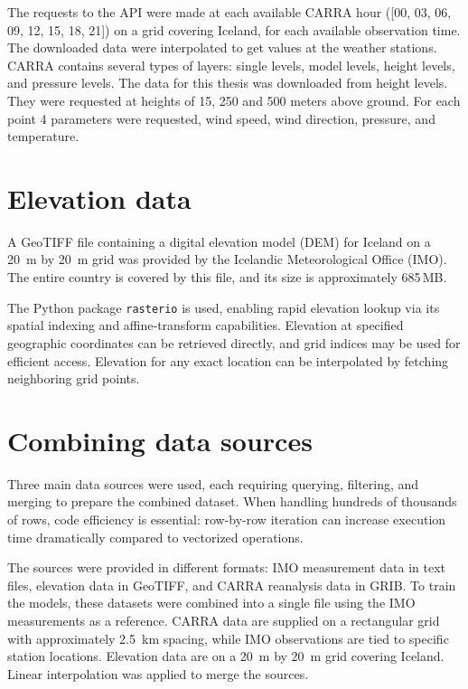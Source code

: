The requests to the API were made at each available CARRA hour ([00, 03, 06, 09, 12, 15, 18, 21]) on a grid covering Iceland, for each available observation time. The downloaded data were interpolated to get values at the weather stations. CARRA contains several types of layers: single levels, model levels, height levels, and pressure levels. The data for this thesis was downloaded from height levels. They were requested at heights of 15, 250 and 500 meters above ground. For each point 4 parameters were requested, wind speed, wind direction, pressure, and temperature.

\section{Elevation data}
A GeoTIFF file containing a digital elevation model (DEM) for Iceland on a 20~m by 20~m grid was provided by the Icelandic Meteorological Office (IMO). The entire country is covered by this file, and its size is approximately 685\,MB.

The Python package \texttt{rasterio} is used, enabling rapid elevation lookup via its spatial indexing and affine‐transform capabilities. Elevation at specified geographic coordinates can be retrieved directly, and grid indices may be used for efficient access. Elevation for any exact location can be interpolated by fetching neighboring grid points.

\section{Combining data sources}

Three main data sources were used, each requiring querying, filtering, and merging to prepare the combined dataset. When handling hundreds of thousands of rows, code efficiency is essential: row-by-row iteration can increase execution time dramatically compared to vectorized operations.

The sources were provided in different formats: IMO measurement data in text files, elevation data in GeoTIFF, and CARRA reanalysis data in GRIB. To train the models, these datasets were combined into a single file using the IMO measurements as a reference. CARRA data are supplied on a rectangular grid with approximately 2.5~km spacing, while IMO observations are tied to specific station locations. Elevation data are on a 20~m by 20~m grid covering Iceland. Linear interpolation was applied to merge the sources.

